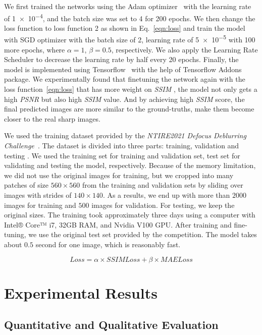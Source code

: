 \documentclass[final]{cvpr}
\begin{document}
We first trained the networks using the Adam optimizer~\cite{adam} with the learning rate of \num{1e-4}, and the batch size was set to 4 for 200 epochs. We then change the loss function to loss function 2 as shown in Eq.~\ref{eqn:loss} and train the model with SGD optimizer with the batch size of 2, learning rate of \num{5e-5} with 100 more epochs, where $\alpha=1$, $\beta=0.5$, respectively. We also apply the Learning Rate Scheduler to decrease the learning rate by half every 20 epochs. Finally, the model is implemented using Tensorflow~\cite{tf} with the help of Tensorflow Addons package. We experimentally found that finetuning the network again with the loss function~\ref{eqn:loss} that has more weight on \textit{SSIM} , the model not only gets a high \textit{PSNR} but also high \textit{SSIM} value. And by achieving high \textit{SSIM} score, the final predicted images are more similar to the ground-truths, make them become closer to the real sharp images.

We used the training dataset provided by the \textit{NTIRE2021 Defocus Deblurring Challenge~\cite{ntire}}. The dataset is divided into three parts: training, validation and testing . We used the training set for training and validation set, test set for validating and testing the model, respectively. Because of the memory limitation, we did not use the original images for training, but we cropped into many patches of size $560\times560$ from the training and validation sets by sliding over images with strides of $140\times140$. As a results, we end up with more than $2000$ images for training and $500$ images for validation. For testing, we keep the original sizes. The training took approximately three days using a computer with Intel® Core™ i7, 32GB RAM, and Nvidia V100 GPU. After training and fine-tuning, we use the original test set provided by the competition. The model takes about $0.5$ second for one image, which is reasonably fast.

\begin{equation}
\label{eqn:loss}
  Loss = \alpha\times SSIMLoss + \beta\times MAELoss
\end{equation}

\section{Experimental Results}
\subsection{Quantitative and Qualitative Evaluation}
\end{document}
